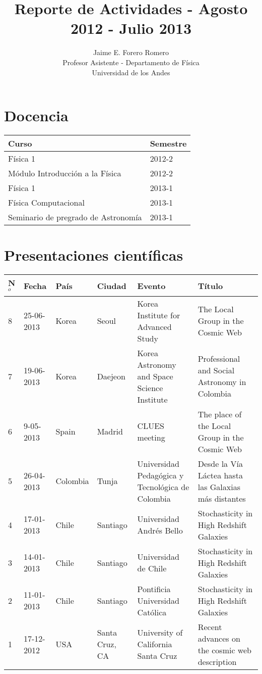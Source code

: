 \documentclass{article}
\title{Reporte de Actividades - Agosto 2012 - Julio 2013}
\author{Jaime E. Forero Romero\\Profesor Asistente - Departamento de
  F\'isica\\Universidad de los Andes}
\begin{document}
\section*{Docencia}

\begin{tabular}{p{7.0cm} p{1.5cm}}\hline
Curso & Semestre\\\hline
F\'isica 1 & 2012-2 \\
M\'odulo Introducci\'on a la F\'isica & 2012-2 \\
F\'isica 1 & 2013-1\\
F\'isica Computacional & 2013-1\\
Seminario de pregrado de Astronom\'ia & 2013-1\\\hline
\end{tabular}

\section*{Presentaciones cient\'ificas}

\begin{tabular}{lp{2.0cm} p{1.2cm} p{1.5cm} p{2cm} p{5cm}}\hline
N$^{o}$ & Fecha & Pa\'is & Ciudad & Evento & T\'itulo \\\hline
8 & 25-06-2013 & Korea & Seoul & Korea Institute for Advanced Study & The Local Group in the Cosmic Web\\
7 & 19-06-2013 & Korea & Daejeon & Korea Astronomy and Space Science Institute & Professional and Social Astronomy in Colombia\\
6 & 9-05-2013 & Spain & Madrid & CLUES meeting & The place of the Local Group in the Cosmic Web\\
5 & 26-04-2013 & Colombia & Tunja & Universidad Pedag\'ogica y
Tecnol\'ogica de Colombia & Desde la V\'ia L\'actea hasta las Galaxias
m\'as distantes\\
4 &17-01-2013 & Chile & Santiago  & Universidad Andr\'es Bello &
Stochasticity in High Redshift Galaxies\\
3 &14-01-2013 & Chile & Santiago  & Universidad de Chile&
Stochasticity in High Redshift Galaxies\\
2 & 11-01-2013 & Chile & Santiago  & Pontificia Universidad Cat\'olica&
Stochasticity in High Redshift Galaxies\\
1 & 17-12-2012 & USA & Santa Cruz, CA & University of California Santa
Cruz & Recent advances on the cosmic web description\\  \hline
\end{tabular}
\end{document}
